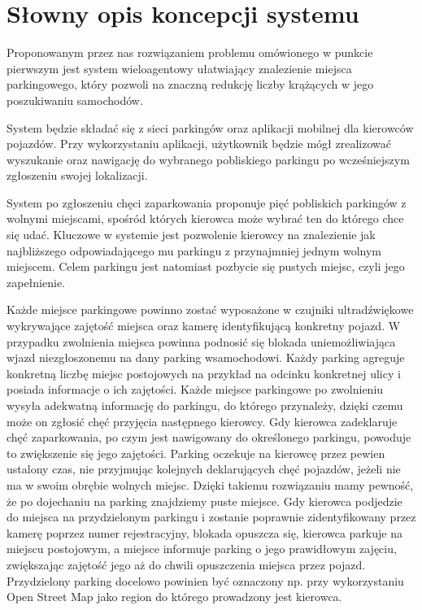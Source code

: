 \newpage
\section{Słowny opis koncepcji systemu}

Proponowanym przez nas rozwiązaniem problemu omówionego w punkcie pierwszym jest system wieloagentowy ułatwiający znalezienie miejsca parkingowego, który pozwoli na znaczną redukcję liczby krążących w jego poszukiwaniu samochodów.

System będzie składać się z sieci parkingów oraz aplikacji mobilnej dla kierowców pojazdów. Przy wykorzystaniu aplikacji, użytkownik będzie mógł zrealizować wyszukanie oraz nawigację do wybranego {\color{teal} pobliskiego parkingu po wcześniejszym zgłoszeniu swojej lokalizacji.}

{\color{teal} System po zgłoszeniu chęci zaparkowania proponuje pięć pobliskich parkingów z wolnymi miejscami, spośród których kierowca może wybrać ten do którego chce się udać. Kluczowe w systemie jest pozwolenie kierowcy na znalezienie jak najbliższego odpowiadającego mu parkingu z przynajmniej jednym wolnym miejscem. Celem parkingu jest natomiast pozbycie się pustych miejsc, czyli jego zapełnienie.}

Każde miejsce parkingowe powinno zostać wyposażone w czujniki ultradźwiękowe wykrywające zajętość miejsca oraz kamerę identyfikującą konkretny pojazd. W przypadku zwolnienia miejsca powinna podnosić się blokada uniemożliwiająca wjazd niezgłoszonemu {\color{teal} na dany parking} wsamochodowi. Każdy parking agreguje konkretną liczbę miejsc postojowych na przykład na odcinku konkretnej ulicy i posiada informacje o ich zajętości. Każde miejsce parkingowe po zwolnieniu wysyła adekwatną informację do parkingu, do którego przynależy, dzięki czemu może on zgłosić chęć przyjęcia następnego kierowcy. Gdy kierowca zadeklaruje chęć zaparkowania, po czym jest nawigowany do określonego parkingu, powoduje to zwiększenie się jego zajętości. Parking oczekuje na kierowcę przez pewien ustalony czas, nie przyjmując kolejnych deklarujących chęć pojazdów, jeżeli nie ma w swoim obrębie wolnych miejsc. Dzięki takiemu rozwiązaniu mamy pewność, że po dojechaniu na parking znajdziemy puste miejsce. Gdy kierowca podjedzie do miejsca na przydzielonym parkingu i zostanie poprawnie zidentyfikowany przez kamerę poprzez numer rejestracyjny, blokada opuszcza się, kierowca parkuje na miejscu postojowym, a miejsce informuje parking o jego prawidłowym zajęciu, zwiększając zajętość jego aż do chwili opuszczenia miejsca przez pojazd. Przydzielony parking docelowo powinien być oznaczony np. przy wykorzystaniu Open Street Map jako region do którego prowadzony jest kierowca. 

